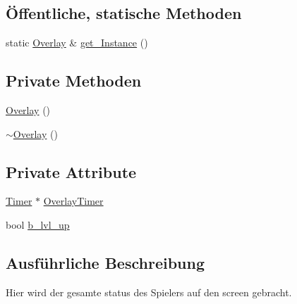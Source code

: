 \subsection*{Öffentliche, statische Methoden}
\begin{DoxyCompactItemize}
\item 
static \hyperlink{class_overlay}{Overlay} \& \hyperlink{class_overlay_a6f0ea07b818fdc4ea2b00f1ed8169a6f}{get\-\_\-\-Instance} ()
\end{DoxyCompactItemize}
\subsection*{Private Methoden}
\begin{DoxyCompactItemize}
\item 
\hyperlink{class_overlay_ab4f509d502931bcaad03418470993d70}{Overlay} ()
\item 
\hyperlink{class_overlay_ad40a5e109ee4acbdec9f21d5496b7fa9}{$\sim$\-Overlay} ()
\end{DoxyCompactItemize}
\subsection*{Private Attribute}
\begin{DoxyCompactItemize}
\item 
\hyperlink{class_timer}{Timer} $\ast$ \hyperlink{class_overlay_ab45976f5ebf2c4c477402654a53a7939}{Overlay\-Timer}
\item 
bool \hyperlink{class_overlay_a57bc17bbe71de98c73f46e71519d5e43}{b\-\_\-lvl\-\_\-up}
\end{DoxyCompactItemize}


\subsection{Ausführliche Beschreibung}
Hier wird der gesamte status des Spielers auf den screen gebracht. 

